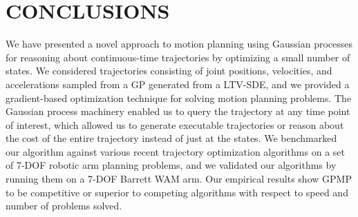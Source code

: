 \documentclass{IEEEtran}
\begin{document}
\section{CONCLUSIONS}
We have presented a novel approach to motion planning
using Gaussian processes for reasoning about continuous-time trajectories by optimizing a small number of states. We
considered trajectories consisting of joint positions, velocities, and accelerations sampled from a GP generated from
a LTV-SDE, and we provided a gradient-based optimization
technique for solving motion planning problems. The Gaussian process machinery enabled us to query the trajectory
at any time point of interest, which allowed us to generate
executable trajectories or reason about the cost of the entire
trajectory instead of just at the states. We benchmarked
our algorithm against various recent trajectory optimization
algorithms on a set of 7-DOF robotic arm planning problems,
and we validated our algorithms by running them on a 7-DOF
Barrett WAM arm. Our empirical results show GPMP to be
competitive or superior to competing algorithms with respect
to speed and number of problems solved.
\newpage
\balance
\end{document}
